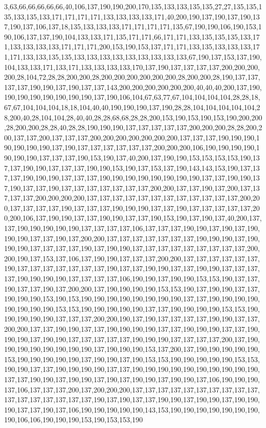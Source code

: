 3,63,66,66,66,66,66,40,106,137,190,190,200,170,135,133,133,135,135,27,27,135,135,135,133,135,133,171,171,171,171,133,133,133,133,171,40,200,190,137,190,137,190,137,190,137,106,137,18,135,133,133,133,171,171,171,171,135,67,190,190,106,190,153,190,106,137,137,190,104,133,133,171,135,171,171,66,171,171,133,135,135,135,133,171,133,133,133,133,171,171,171,200,153,190,153,137,171,171,133,135,133,133,133,171,171,133,133,135,135,133,133,133,133,133,133,133,133,133,67,190,137,153,137,190,104,133,133,171,133,171,133,133,133,133,170,137,190,137,137,137,137,200,200,200,200,28,104,72,28,28,200,200,28,200,200,200,200,200,200,28,200,200,28,190,137,137,137,137,190,190,137,190,137,137,143,200,200,200,200,200,200,40,40,40,200,137,190,190,190,190,190,190,190,190,137,190,106,104,67,63,77,67,104,104,104,104,28,28,18,67,67,104,104,104,18,18,104,40,40,190,190,190,137,190,28,28,104,104,104,104,104,28,200,40,28,104,104,28,40,40,28,28,68,68,28,28,200,153,190,153,190,153,190,200,200,28,200,200,28,28,40,28,28,190,190,190,137,137,137,137,137,200,200,200,28,28,200,200,137,137,200,137,137,137,200,200,200,200,200,200,200,137,137,137,190,190,190,190,190,190,190,137,190,137,137,137,137,137,137,200,200,200,106,190,190,190,190,190,190,190,137,137,137,190,153,190,137,40,200,137,190,190,153,153,153,153,190,137,137,190,190,137,137,137,190,190,153,190,137,153,137,190,143,143,153,190,137,137,137,190,190,190,137,137,137,190,190,190,190,190,190,190,190,137,137,190,190,137,190,137,137,190,137,137,137,137,137,137,137,200,200,137,137,190,137,200,137,137,137,137,200,200,200,200,137,137,137,137,137,137,137,137,137,137,137,137,200,200,137,137,137,137,190,137,137,137,190,190,190,137,137,190,137,137,137,137,137,200,200,106,137,190,190,137,137,190,190,137,137,190,153,190,137,190,137,40,200,137,137,190,190,190,190,190,137,137,137,137,106,137,137,137,190,190,137,190,137,190,190,190,137,137,190,137,200,200,137,137,137,137,137,137,137,190,190,190,137,190,190,190,137,137,137,137,190,137,190,190,137,137,137,137,137,137,137,137,137,200,200,190,137,153,137,106,137,190,190,137,137,137,200,200,137,137,137,137,137,137,190,137,137,137,137,137,137,137,190,137,137,190,190,137,137,190,190,137,137,137,137,190,190,190,190,137,137,137,137,106,190,190,137,190,190,153,153,190,137,137,190,137,137,190,137,200,200,137,190,190,190,190,153,153,190,137,190,190,137,137,190,190,190,153,190,153,190,190,190,190,190,190,190,190,137,137,190,190,190,190,190,190,190,190,153,153,190,190,190,190,190,137,137,190,190,190,190,153,153,190,190,190,190,190,137,137,137,200,200,190,137,190,137,137,137,137,190,190,137,137,200,200,137,137,190,190,137,137,190,190,190,190,137,137,190,190,190,137,137,190,190,190,137,190,190,137,137,137,137,137,190,190,190,137,137,137,137,200,137,190,190,190,190,190,190,190,190,137,190,190,190,153,137,200,137,190,190,190,190,190,153,190,190,190,190,190,137,190,190,137,190,153,153,190,190,190,190,190,153,153,190,190,137,137,190,190,190,190,137,137,190,190,190,190,190,190,190,190,190,190,137,137,190,190,137,190,190,137,190,137,190,190,137,190,190,137,106,190,190,190,137,106,137,137,137,200,137,200,200,200,137,137,137,137,137,137,137,137,137,137,137,137,137,137,137,137,137,190,137,190,137,137,190,190,137,190,190,137,190,190,190,137,137,190,137,106,190,190,190,190,190,143,153,190,190,190,190,190,190,190,190,106,106,190,190,190,153,190,153,153,190